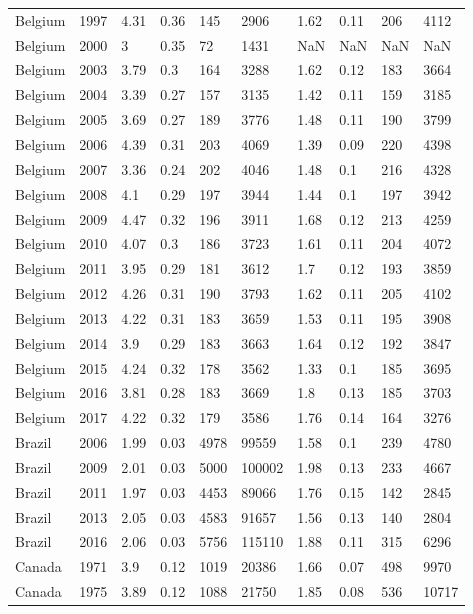 \begin{tabular}{llllllllll}
Belgium & 1997 & 4.31 & 0.36 & 145 & 2906 & 1.62 & 0.11 & 206 & 4112 \\ 
Belgium & 2000 & 3 & 0.35 & 72 & 1431 & NaN & NaN & NaN & NaN \\ 
Belgium & 2003 & 3.79 & 0.3 & 164 & 3288 & 1.62 & 0.12 & 183 & 3664 \\ 
Belgium & 2004 & 3.39 & 0.27 & 157 & 3135 & 1.42 & 0.11 & 159 & 3185 \\ 
Belgium & 2005 & 3.69 & 0.27 & 189 & 3776 & 1.48 & 0.11 & 190 & 3799 \\ 
Belgium & 2006 & 4.39 & 0.31 & 203 & 4069 & 1.39 & 0.09 & 220 & 4398 \\ 
Belgium & 2007 & 3.36 & 0.24 & 202 & 4046 & 1.48 & 0.1 & 216 & 4328 \\ 
Belgium & 2008 & 4.1 & 0.29 & 197 & 3944 & 1.44 & 0.1 & 197 & 3942 \\ 
Belgium & 2009 & 4.47 & 0.32 & 196 & 3911 & 1.68 & 0.12 & 213 & 4259 \\ 
Belgium & 2010 & 4.07 & 0.3 & 186 & 3723 & 1.61 & 0.11 & 204 & 4072 \\ 
Belgium & 2011 & 3.95 & 0.29 & 181 & 3612 & 1.7 & 0.12 & 193 & 3859 \\ 
Belgium & 2012 & 4.26 & 0.31 & 190 & 3793 & 1.62 & 0.11 & 205 & 4102 \\ 
Belgium & 2013 & 4.22 & 0.31 & 183 & 3659 & 1.53 & 0.11 & 195 & 3908 \\ 
Belgium & 2014 & 3.9 & 0.29 & 183 & 3663 & 1.64 & 0.12 & 192 & 3847 \\ 
Belgium & 2015 & 4.24 & 0.32 & 178 & 3562 & 1.33 & 0.1 & 185 & 3695 \\ 
Belgium & 2016 & 3.81 & 0.28 & 183 & 3669 & 1.8 & 0.13 & 185 & 3703 \\ 
Belgium & 2017 & 4.22 & 0.32 & 179 & 3586 & 1.76 & 0.14 & 164 & 3276 \\ 
Brazil & 2006 & 1.99 & 0.03 & 4978 & 99559 & 1.58 & 0.1 & 239 & 4780 \\ 
Brazil & 2009 & 2.01 & 0.03 & 5000 & 100002 & 1.98 & 0.13 & 233 & 4667 \\ 
Brazil & 2011 & 1.97 & 0.03 & 4453 & 89066 & 1.76 & 0.15 & 142 & 2845 \\ 
Brazil & 2013 & 2.05 & 0.03 & 4583 & 91657 & 1.56 & 0.13 & 140 & 2804 \\ 
Brazil & 2016 & 2.06 & 0.03 & 5756 & 115110 & 1.88 & 0.11 & 315 & 6296 \\ 
Canada & 1971 & 3.9 & 0.12 & 1019 & 20386 & 1.66 & 0.07 & 498 & 9970 \\ 
Canada & 1975 & 3.89 & 0.12 & 1088 & 21750 & 1.85 & 0.08 & 536 & 10717 \\ 

\end{tabular}
